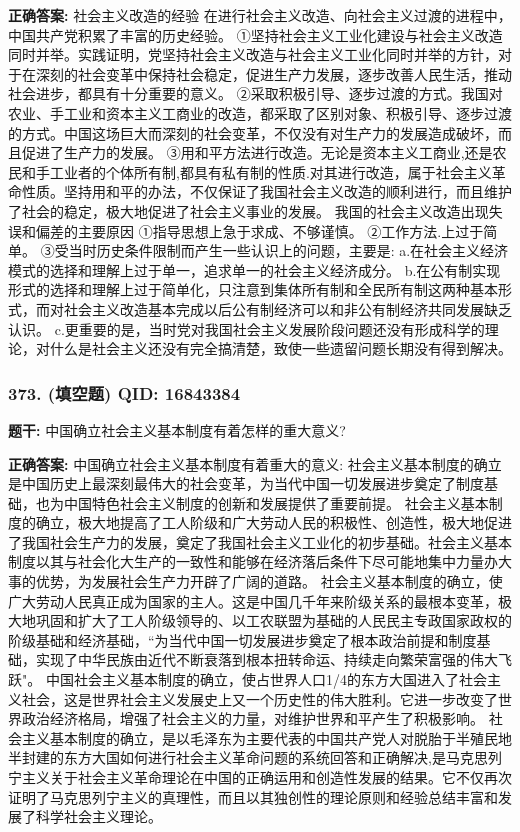 \documentclass[12pt,UTF8]{ctexart}
\begin{document}
\textbf{正确答案:}
社会主义改造的经验
在进行社会主义改造、向社会主义过渡的进程中，中国共产党积累了丰富的历史经验。
①坚持社会主义工业化建设与社会主义改造同时并举。实践证明，党坚持社会主义改造与社会主义工业化同时并举的方针，对于在深刻的社会变革中保持社会稳定，促进生产力发展，逐步改善人民生活，推动社会进步，都具有十分重要的意义。
②采取积极引导、逐步过渡的方式。我国对农业、手工业和资本主义工商业的改造，都采取了区别对象、积极引导、逐步过渡的方式。中国这场巨大而深刻的社会变革，不仅没有对生产力的发展造成破坏，而且促进了生产力的发展。
③用和平方法进行改造。无论是资本主义工商业,还是农民和手工业者的个体所有制,都具有私有制的性质.对其进行改造，属于社会主义革命性质。坚持用和平的办法，不仅保证了我国社会主义改造的顺利进行，而且维护了社会的稳定，极大地促进了社会主义事业的发展。
我国的社会主义改造出现失误和偏差的主要原因
①指导思想上急于求成、不够谨慎。
②工作方法.上过于简单。
③受当时历史条件限制而产生一些认识上的问题，主要是:
a.在社会主义经济模式的选择和理解上过于单一，追求单一的社会主义经济成分。
b.在公有制实现形式的选择和理解上过于简单化，只注意到集体所有制和全民所有制这两种基本形式，而对社会主义改造基本完成以后公有制经济可以和非公有制经济共同发展缺乏认识。
c.更重要的是，当时党对我国社会主义发展阶段问题还没有形成科学的理论，对什么是社会主义还没有完全搞清楚，致使一些遗留问题长期没有得到解决。

\vspace{0.3em}\hrulefill\vspace{0.7em}

\subsubsection*{373. (填空题) \small QID: 16843384}

\textbf{题干:}
中国确立社会主义基本制度有着怎样的重大意义?

\textbf{正确答案:}
中国确立社会主义基本制度有着重大的意义:
社会主义基本制度的确立是中国历史上最深刻最伟大的社会变革，为当代中国一切发展进步奠定了制度基础，也为中国特色社会主义制度的创新和发展提供了重要前提。
社会主义基本制度的确立，极大地提高了工人阶级和广大劳动人民的积极性、创造性，极大地促进了我国社会生产力的发展，奠定了我国社会主义工业化的初步基础。社会主义基本制度以其与社会化大生产的一致性和能够在经济落后条件下尽可能地集中力量办大事的优势，为发展社会生产力开辟了广阔的道路。
社会主义基本制度的确立，使广大劳动人民真正成为国家的主人。这是中国几千年来阶级关系的最根本变革，极大地巩固和扩大了工人阶级领导的、以工农联盟为基础的人民民主专政国家政权的阶级基础和经济基础，“为当代中国一切发展进步奠定了根本政治前提和制度基础，实现了中华民族由近代不断衰落到根本扭转命运、持续走向繁荣富强的伟大飞跃"。
中国社会主义基本制度的确立，使占世界人口1/4的东方大国进入了社会主义社会，这是世界社会主义发展史上又一个历史性的伟大胜利。它进一步改变了世界政治经济格局，增强了社会主义的力量，对维护世界和平产生了积极影响。
社会主义基本制度的确立，是以毛泽东为主要代表的中国共产党人对脱胎于半殖民地半封建的东方大国如何进行社会主义革命问题的系统回答和正确解决,是马克思列宁主义关于社会主义革命理论在中国的正确运用和创造性发展的结果。它不仅再次证明了马克思列宁主义的真理性，而且以其独创性的理论原则和经验总结丰富和发展了科学社会主义理论。
\end{document}
